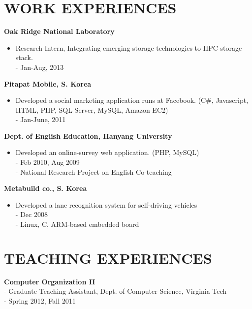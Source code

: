 \documentclass{res}
\begin{document}
\begin{resume}
\section{WORK EXPERIENCES} 
\vspace{0.1in} 
   {\bf Oak Ridge National Laboratory}
      \begin{itemize}
      \item[] Research Intern, Integrating emerging storage technologies to
	      HPC storage stack.
      \vspace{0.05in}\\
      - {\small Jan-Aug, 2013}
      \end{itemize}
   {\bf Pitapat Mobile, S. Korea}
      \begin{itemize}
      \item[] Developed a social marketing application runs at Facebook. (C\#,
      Javascript, HTML, PHP, SQL Server, MySQL, Amazon EC2)
      \vspace{0.05in}\\
      - {\small Jan-June, 2011}
      \end{itemize}
   {\bf Dept. of English Education, Hanyang University}
      \begin{itemize}
      \item[] Developed an online-survey web application. (PHP, MySQL)
      \vspace{0.05in}\\
      - {\small Feb 2010, Aug 2009}\\
      - {\small National Research Project on English Co-teaching}
      \end{itemize}
   {\bf Metabuild co., S. Korea}
      \begin{itemize}
      \item[] Developed a lane recognition system for self-driving vehicles
      \vspace{0.05in}\\
      - {\small Dec 2008}\\
      - {\small Linux, C, ARM-based embedded board}
      \end{itemize}
 
 
\section{TEACHING EXPERIENCES} 
\vspace{0.1in} 
   {\bf Computer Organization II}
      \vspace{0.02in}\\
      - {\small Graduate Teaching Assistant, Dept. of Computer Science, Virginia
      Tech}\\
      - {\small Spring 2012, Fall 2011}


\end{resume}
\end{document}
